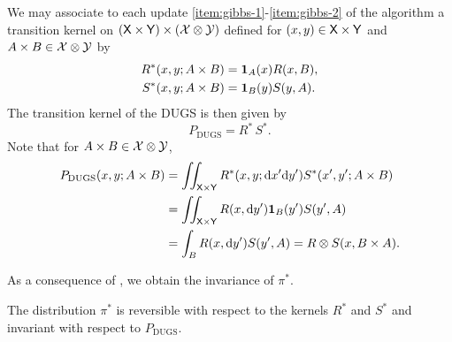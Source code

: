 \documentclass[english,graybox,envcountchap,envcountsame,sectrefs,shortlabels]{svmono}
\theoremstyle{style}
\newcommand{\Yset}{\mathsf{Y}}
\newcommand{\Ysigma}{\mathcal{Y}}
\newcommand{\eqsp}{}
\begin{document}
We may associate to each update \ref{item:gibbs-1}-\ref{item:gibbs-2} of the algorithm a
transition kernel on $(\Xset \times \Yset) \times (\Xsigma \otimes \Ysigma)$ defined for
$(x,y) \in \Xset \times \Yset$ and $A\times B \in \Xsigma \otimes \Ysigma$ by
\begin{align}
  \label{eq:definition-R^*}
  R^*(x,y;A\times B)  & = \indi{A}(x)R(x,B) \eqsp , \\
  \label{eq:definition-S^*}
  S^*(x,y;A \times B) & = \indi{B}(y)S(y,A) \eqsp .
\end{align}
The transition kernel of the DUGS is then given by
\begin{equation}
  \label{eq:kernel:DUGS}
  P_{\mathrm{DUGS}} = R^* \, S^* \eqsp.
\end{equation}
Note that for $A\times B \in \Xsigma \otimes \Ysigma$,
\begin{align}
  P_{\mathrm{DUGS}}(x,y;A\times B)
  & = \iint_{\Xset\times\Yset}  R^*(x,y;\rmd x' \rmd y') S^*(x',y'; A \times B) \nonumber \\
  & = \iint_{\Xset\times\Yset}   R(x,\rmd y') \indi{B}(y')S(y',A)  \nonumber \\
  & = \int_B R(x,\rmd y') S(y',A) = R \otimes S (x,B\times A) \eqsp . \label{eq:identity-PDUGS}
\end{align}

As a consequence of , we obtain the invariance of $\pi^*$.
\begin{lemma}
  \label{lem:gibbs-reversibility-individual}
  The distribution $\pi^*$ is reversible with respect to the kernels $R^*$ and $S^*$ and invariant
  with respect to $P_{\mathrm{DUGS}}$.
\end{lemma}
\end{document}
